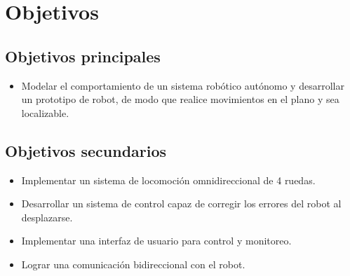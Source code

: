 \chapter{Objetivos}

\section{Objetivos principales}

\begin{itemize}
    \item Modelar el comportamiento de un sistema robótico autónomo y desarrollar un prototipo de robot, de modo que realice movimientos en el plano y sea localizable.
\end{itemize}


\section{Objetivos secundarios}

\begin{itemize}
    \item Implementar un sistema de locomoción omnidireccional de 4 ruedas.
    \item Desarrollar un sistema de control capaz de corregir los errores del robot al desplazarse.
    \item Implementar una interfaz de usuario para control y monitoreo.
    \item Lograr una comunicación bidireccional con el robot.
\end{itemize}